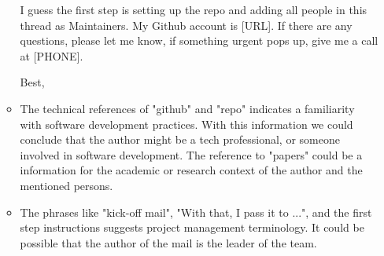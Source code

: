 \documentclass[a4 paper]{article}
\numberwithin{equation}{section}
\newcommand{\0}{\mathbf{0}}
\begin{document}
\begin{itemize}
\begin{itemize}
        I guess the first step is setting up the repo and adding all people in this thread as Maintainers. My Github account is [URL]. If there are any questions, please let me know, if something urgent pops up, give me a call at [PHONE].
        
        Best,
        \item The technical references of "github" and "repo" indicates a familiarity with software development practices. With this information we could conclude that the author might be a tech professional, or someone involved in software development. The reference to "papers" could be a information for the academic or research context of the author and the mentioned persons.
        \item The phrases like "kick-off mail", "With that, I pass it to ...", and the first step instructions suggests project management terminology. It could be possible that the author of the mail is the leader of the team.
        \end{itemize}
        
\end{itemize}
\end{document}
